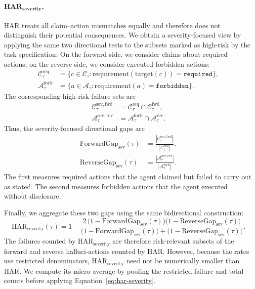 \paragraph{\textbf{$\mathbf{HAR}_{\mathbf{severity}}$}.}
HAR treats all claim--action mismatches equally and therefore does not
distinguish their potential consequences. We obtain a severity-focused view
by applying the same two directional tests to the subsets marked as
high-risk by the task specification. On the forward side, we consider
claims about required actions; on the reverse side, we consider executed
forbidden actions:
\begin{equation}
\begin{aligned}
\mathcal{C}^{\mathrm{req}}_\tau
&=
\bigl\{c\in\mathcal{C}_\tau:
\mathrm{requirement}(\mathrm{target}(c))
=\texttt{required}\bigr\},\\
\mathcal{A}^{\mathrm{forb}}_\tau
&=
\bigl\{a\in\mathcal{A}_\tau:
\mathrm{requirement}(a)
=\texttt{forbidden}\bigr\}.
\end{aligned}
\end{equation}
The corresponding high-risk failure sets are
\begin{equation}
\begin{aligned}
\mathcal{C}^{\mathrm{sev,fwd}}_\tau
&=
\mathcal{C}^{\mathrm{req}}_\tau
\cap
\mathcal{C}^{\mathrm{fwd}}_\tau,\\
\mathcal{A}^{\mathrm{sev,rev}}_\tau
&=
\mathcal{A}^{\mathrm{forb}}_\tau
\cap
\mathcal{A}^{\mathrm{rev}}_\tau.
\end{aligned}
\end{equation}
Thus, the severity-focused directional gaps are
\begin{equation}
\begin{aligned}
\mathrm{ForwardGap}_{\mathrm{sev}}(\tau)
&=
\frac{|\mathcal{C}^{\mathrm{sev,fwd}}_\tau|}
{|\mathcal{C}^{\mathrm{req}}_\tau|},\\
\mathrm{ReverseGap}_{\mathrm{sev}}(\tau)
&=
\frac{|\mathcal{A}^{\mathrm{sev,rev}}_\tau|}
{|\mathcal{A}^{\mathrm{forb}}_\tau|}.
\end{aligned}
\label{eq:severity-gaps}
\end{equation}
The first measures required actions that the agent claimed but failed to
carry out as stated. The second measures forbidden actions that the agent
executed without disclosure.

Finally, we aggregate these two gaps using the same bidirectional
construction:
\begin{equation}
\mathrm{HAR}_{\mathrm{severity}}(\tau)
=
1-
\frac{
2\,
\bigl(1-\mathrm{ForwardGap}_{\mathrm{sev}}(\tau)\bigr)
\bigl(1-\mathrm{ReverseGap}_{\mathrm{sev}}(\tau)\bigr)
}{
\bigl(1-\mathrm{ForwardGap}_{\mathrm{sev}}(\tau)\bigr)
+
\bigl(1-\mathrm{ReverseGap}_{\mathrm{sev}}(\tau)\bigr)
}.
\label{eq:har-severity}
\end{equation}
The failures counted by
$\mathrm{HAR}_{\mathrm{severity}}$ are therefore risk-relevant subsets of
the forward and reverse halluci-actions counted by HAR. However, because
the rates use restricted denominators,
$\mathrm{HAR}_{\mathrm{severity}}$ need not be numerically smaller than
HAR. We compute its micro average by pooling the restricted failure and
total counts before applying Equation~\ref{eq:har-severity}.


